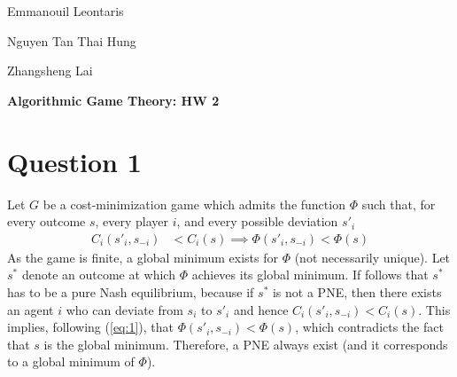 \documentclass[a4paper,12pt]{article}
\theoremstyle{definition}
\begin{document}
\begin{flushright}
	Emmanouil Leontaris
	
	Nguyen Tan Thai Hung
	
	Zhangsheng Lai
\end{flushright}

\begin{center}
	\Huge{\bfseries Algorithmic Game Theory: HW 2}
\end{center}

\section*{Question 1}

Let $G$ be a cost-minimization game which admits the function $\Phi$ such that, for every outcome $s$, every player $i$, and every possible deviation $s'_i$
\begin{align} \label{eq:1}
	C_i(s'_i,s_{-i})&<C_i(s) \implies \Phi(s'_i,s_{-i}) <\Phi(s)
\end{align}
As the game is finite, a global minimum exists for $\Phi$ (not necessarily unique). Let $s^*$ denote an outcome at which $\Phi$ achieves its global minimum. If follows that $s^*$ has to be a pure Nash equilibrium, because if $s^*$ is not a PNE, then there exists an agent $i$ who can deviate from $s_i$ to $s'_i$ and hence $C_i(s'_i,s_{-i}) <C_i(s)$. This implies, following (\ref{eq:1}), that $\Phi(s'_i,s_{-i}) <\Phi(s)$, which contradicts the fact that $s$ is the global minimum. Therefore, a PNE always exist (and it corresponds to a global minimum of $\Phi$).
\end{document}
